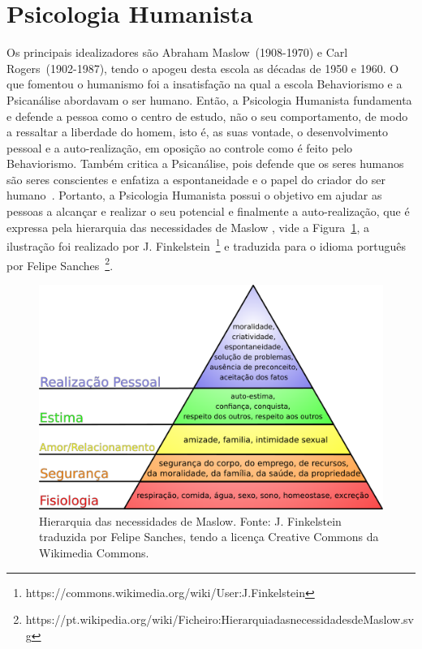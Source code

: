 \section{Psicologia Humanista}\label{humanismo}

Os principais idealizadores são Abraham Maslow~(1908-1970) e Carl Rogers~(1902-1987), tendo o apogeu desta escola as décadas de 1950 e 1960. 
O que fomentou o humanismo foi a insatisfação na qual a escola Behaviorismo e a Psicanálise abordavam o ser humano. 
Então, a Psicologia Humanista fundamenta e defende a pessoa como o centro de estudo, não o seu comportamento, de modo a ressaltar a liberdade do homem, isto é, as suas vontade, o desenvolvimento pessoal e a auto-realização, em oposição ao controle como é feito pelo Behaviorismo.
Também critica a Psicanálise, pois defende que os seres humanos são seres conscientes e enfatiza a espontaneidade e o papel do criador do ser humano~\cite{silva2007psicologia_educacao}.
Portanto, a Psicologia Humanista possui o objetivo em ajudar as pessoas a alcançar e realizar o seu potencial e finalmente a auto-realização, que é expressa pela hierarquia das necessidades de Maslow \cite{laruse2009geral,rogers2017pessoa}, vide a Figura~\ref{img:triangulo-maslow}, a ilustração foi realizado por J. Finkelstein~\footnote{https://commons.wikimedia.org/wiki/User:J.\underline{\hspace{.1cm}}Finkelstein} e traduzida para o idioma português por Felipe Sanches~\footnote{https://pt.wikipedia.org/wiki/Ficheiro:Hierarquia\underline{\hspace{.1cm}}das\underline{\hspace{.1cm}}necessidades\underline{\hspace{.1cm}}de\underline{\hspace{.1cm}}Maslow.svg}.


\begin{figure}[!htp]
    \centering
    \includegraphics[scale=.32]{../../../img/psicologia/triangulo-maslow.pdf}
    \caption{
                Hierarquia das necessidades de Maslow. 
                Fonte: J. Finkelstein traduzida por Felipe Sanches, tendo a licença Creative Commons da Wikimedia Commons.
            }
    \label{img:triangulo-maslow}
\end{figure}


